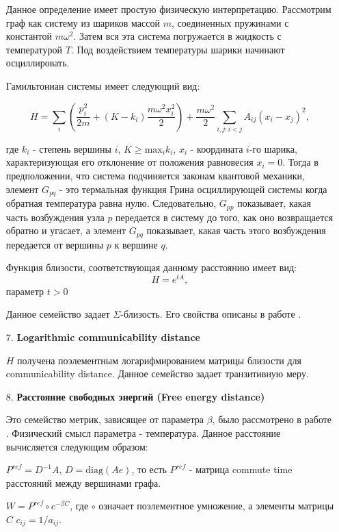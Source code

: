 \begin{itemize}
Данное определение имеет простую физическую интерпретацию. Рассмотрим граф как систему из шариков массой $m$, соединенных пружинами с константой $m \omega ^2$. Затем вся эта система погружается в жидкость с температурой $T$. Под воздействием температуры шарики начинают осциллировать.

Гамильтониан системы имеет следующий вид:

$$H = \sum\limits_{i} \left(\frac{p_i^2}{2m} + (K-k_i)\frac{m\omega ^2 x_i^2}{2}\right) + \frac{m \omega ^2}{2} \sum\limits_{i,j : i<j} A_{ij} (x_i-x_j)^2, $$

где $k_i$ - степень вершины $i$, $K \ge \text{max}_i k_i$, $x_i$ - координата $i$-го шарика, характеризующая его отклонение от положения равновесия $x_i =0$. Тогда в предположении, что система подчиняется законам квантовой механики, элемент $G_{pq}$ - это термальная функция Грина осциллирующей системы когда обратная температура равна нулю. Следовательно, $G_{pp}$ показывает, какая часть возбуждения узла $p$ передается в систему до того, как оно возвращается обратно и угасает, а элемент $G_{pq}$ показывает, какая часть этого возбуждения передается от вершины $p$ к вершине $q$. 


Функция близости, соответствующая данному расстоянию имеет вид:
\begin{equation}
H = e^{tA},
\end{equation}
 параметр $t > 0$
 
Данное семейство задает $\Sigma$-близость. Его свойства описаны в работе \cite{estrada2012communicability}.

\item[7.] \textbf{Logarithmic communicability distance}

$H$ получена поэлементным логарифмированием матрицы близости для communicability distance. Данное семейство задает транзитивную меру.

\item[8.] \textbf{Расстояние свободных энергий (Free energy distance)}

Это семейство метрик, зависящее от параметра $\beta$, было рассмотрено в работе \cite{kivimaki2014developments}. Физический смысл параметра - температура. Данное расстояние вычисляется следующим образом:

$P^{ref} = D^{-1}A$, $D = \text{diag}(Ae)$, то есть $P^{ref}$ - матрица commute time расстояний между вершинами графа.

$W = P^{ref} \circ e^{-\beta C}$, где $\circ$ означает поэлементное умножение, а элементы матрицы $C$ $c_{ij} = 1 / a_{ij}.$


\end{itemize}
